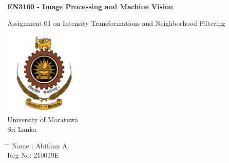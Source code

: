 \documentclass[12pt,a4paper]{article}
\title{}
\author{}
\date{}
\begin{document}
	
\newcommand{\subf}[2]{%
    {\small\begin{tabular}[t]{@{}c@{}}
            #1\\#1
    \end{tabular}}%
}

\begin{titlepage}
    \begin{center}
        \vspace{1cm}		
        \Huge
        \textbf{EN3160 - Image Processing and Machine Vision}

        \vspace{0.5cm}
        {\LARGE Assignment 01 on Intensity Transformations and Neighborhood
Filtering}
        \vspace{1cm}
        \large			
        \vspace{0.5cm}
        \LARGE			
        \vspace{3cm}
        
        \textbf{}
        \includegraphics[width=0.3\textwidth]{university.png}\\
        {\Large University of Moratuwa}
        \\
        {\Large Sri Lanka}
        \vfill			
        \vspace{0.4cm}
        \Large
    \end{center}
    
    \Large
    \vspace{1cm}
    \begin{tabbing}
        \hspace*{11em}\= \hspace*{4em} \= \kill %
        \> Name\> :  Abithan A.\\
        \> Reg No\>:  210019E \\
    \end{tabbing}
    

\end{titlepage}
\end{document}
